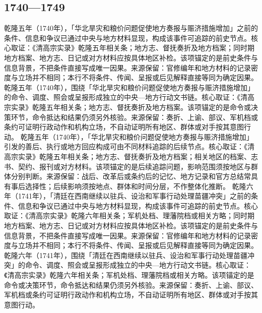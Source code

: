 \subsection{1740—1749}
乾隆五年（1740年），「华北旱灾和粮价问题促使地方奏报与赈济措施增加」之前的条件、信息和争议已通过中央与地方材料显现，构成该事件可追踪的前史节点。核心取证：《清高宗实录》乾隆五年相关条；地方志、督抚奏折及地方档案；同时期地方档案、地方志、日记或对方材料应按具体地区补检。该项锚定的是前史条件与信息背景，不把条件直接写成唯一因果。来源保留：官修编年和地方材料的记录密度与立场并不相同；本行不将条件、传闻、呈报或后见解释直接等同为确定因果。
乾隆五年（1740年），围绕「华北旱灾和粮价问题促使地方奏报与赈济措施增加」的命令、调度、照会或呈报形成独立的中央—地方行动文书链。核心取证：《清高宗实录》乾隆五年相关条；地方志、督抚奏折及地方档案。该项锚定的是命令或决策环节，命令抵达和结果仍须另外核验。来源保留：奏折、上谕、部议、军机档或条约可证明行政动作和机构立场，不自动证明所有地区、群体或对手按其意图行动。
乾隆五年（1740年），「华北旱灾和粮价问题促使地方奏报与赈济措施增加」引发的善后、执行或地方回应构成可由不同材料追踪的后续节点。核心取证：《清高宗实录》乾隆五年相关条；地方志、督抚奏折及地方档案；相关地区的档案、志书、契约、报刊或对方材料。该项锚定的是后续追踪问题，影响范围须按地区与群体分别判断。来源保留：战后、改革后或条约后的记忆、地方记录和官方总结常具有事后选择性；后续影响须按地点、群体和时间分层，不作整体化推断。
乾隆六年（1741年），「清廷在西南继续以驻兵、设治和军事行动处理苗疆冲突」之前的条件、信息和争议已通过中央与地方材料显现，构成该事件可追踪的前史节点。核心取证：《清高宗实录》乾隆六年相关条；军机处档、理藩院档或相关方略；同时期地方档案、地方志、日记或对方材料应按具体地区补检。该项锚定的是前史条件与信息背景，不把条件直接写成唯一因果。来源保留：官修编年和地方材料的记录密度与立场并不相同；本行不将条件、传闻、呈报或后见解释直接等同为确定因果。
乾隆六年（1741年），围绕「清廷在西南继续以驻兵、设治和军事行动处理苗疆冲突」的命令、调度、照会或呈报形成独立的中央—地方行动文书链。核心取证：《清高宗实录》乾隆六年相关条；军机处档、理藩院档或相关方略。该项锚定的是命令或决策环节，命令抵达和结果仍须另外核验。来源保留：奏折、上谕、部议、军机档或条约可证明行政动作和机构立场，不自动证明所有地区、群体或对手按其意图行动。
